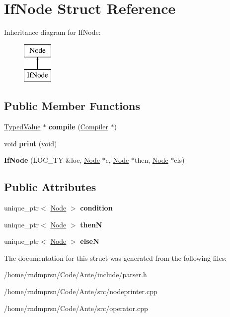 \hypertarget{structIfNode}{}\section{If\+Node Struct Reference}
\label{structIfNode}
Inheritance diagram for If\+Node\+:\begin{figure}[H]
\begin{center}
\leavevmode
\includegraphics[height=2.000000cm]{structIfNode}
\end{center}
\end{figure}
\subsection*{Public Member Functions}
\begin{DoxyCompactItemize}
\item 
\mbox{\label{structIfNode_a888d7280237132278bffb9c22f9f803a}} 
\hyperlink{structTypedValue}{Typed\+Value} $\ast$ {\bfseries compile} (\hyperlink{structante_1_1Compiler}{Compiler} $\ast$)
\item 
\mbox{\label{structIfNode_aea09be77b6112c63d09c40969d6bcee3}} 
void {\bfseries print} (void)
\item 
\mbox{\label{structIfNode_a2e8033163d5693c0fab83a5db694e3d2}} 
{\bfseries If\+Node} (L\+O\+C\+\_\+\+TY \&loc, \hyperlink{structNode}{Node} $\ast$c, \hyperlink{structNode}{Node} $\ast$then, \hyperlink{structNode}{Node} $\ast$els)
\end{DoxyCompactItemize}
\subsection*{Public Attributes}
\begin{DoxyCompactItemize}
\item 
\mbox{\label{structIfNode_a1c53f595978cb303191d67202e9dafef}} 
unique\+\_\+ptr$<$ \hyperlink{structNode}{Node} $>$ {\bfseries condition}
\item 
\mbox{\label{structIfNode_ac5a9c3582e3001dabed05f291dd8b7a3}} 
unique\+\_\+ptr$<$ \hyperlink{structNode}{Node} $>$ {\bfseries thenN}
\item 
\mbox{\label{structIfNode_abcb2e2f49e01419fb158f39b6fa9a2b0}} 
unique\+\_\+ptr$<$ \hyperlink{structNode}{Node} $>$ {\bfseries elseN}
\end{DoxyCompactItemize}


The documentation for this struct was generated from the following files\+:\begin{DoxyCompactItemize}
\item 
/home/rndmprsn/\+Code/\+Ante/include/parser.\+h\item 
/home/rndmprsn/\+Code/\+Ante/src/nodeprinter.\+cpp\item 
/home/rndmprsn/\+Code/\+Ante/src/operator.\+cpp\end{DoxyCompactItemize}
